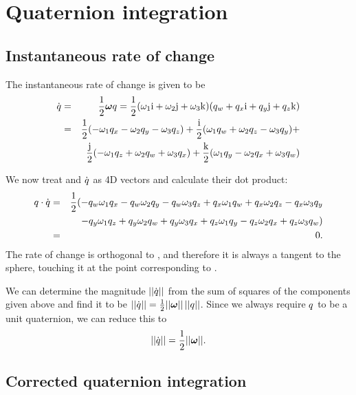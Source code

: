 \section{Quaternion integration\label{quatProofs}}
\subsection{Instantaneous rate of change\label{quatRateOfChangeOrthogonal}}
The instantaneous rate of change is given to be
\begin{eqnarray*}
\dot{\q{q}} & = & \frac{1}{2}\ve{\omega}\q{q} =
    \frac{1}{2}(\omega_1\qi + \omega_2\qj + \omega_3\qk)
    (q_w + q_x\qi + q_y\qj + q_z\qk) \\*
& = & \frac{1}{2} ( - \omega_1 q_x - \omega_2 q_y - \omega_3 q_z ) +
    \frac{\qi}{2} ( \omega_1 q_w + \omega_2 q_z - \omega_3 q_y ) + \\*
&&  \frac{\qj}{2} (-\omega_1 q_z + \omega_2 q_w + \omega_3 q_x ) +
    \frac{\qk}{2} ( \omega_1 q_y - \omega_2 q_x + \omega_3 q_w )
\end{eqnarray*}

We now treat  and $\dot{\mbox{$q$}}$ as 4D vectors and calculate
their dot product:
\begin{eqnarray*}
\mbox{$q$}\cdot\dot{\mbox{$q$}} & = & \frac{1}{2} (
    - q_w \omega_1 q_x - q_w \omega_2 q_y - q_w \omega_3 q_z
    + q_x \omega_1 q_w + q_x \omega_2 q_z - q_x \omega_3 q_y \\*
&&  - q_y \omega_1 q_z + q_y \omega_2 q_w + q_y \omega_3 q_x
    + q_z \omega_1 q_y - q_z \omega_2 q_x + q_z \omega_3 q_w ) \\*
& = & 0.
\end{eqnarray*}
The rate of change is orthogonal to , and therefore it is always
a tangent to the sphere, touching it at the point corresponding to .

We can determine the magnitude $\mbox{$||\dot{\mbox{$q$}}||$}$ from the sum of squares of the
components given above and find it to be
$\norm{\dot{\q{q}}} = \frac{1}{2}\norm{\ve{\omega}}\,\norm{\q{q}}$. Since we always
require $\mbox{$q$}$ to be a unit quaternion, we can reduce this to
\begin{equation}
\label{quatRateOfChangeMagnitude}
\norm{\dot{\q{q}}} = \frac{1}{2}\norm{\ve{\omega}}.
\end{equation}

\subsection{Corrected quaternion integration\label{quatIntegrationDerivation}}

